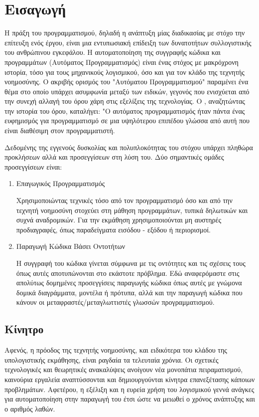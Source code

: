 \chapter{Εισαγωγή}

Η πράξη του προγραμματισμού, δηλαδή η ανάπτυξη μίας διαδικασίας με στόχο την επίτευξη ενός έργου, είναι μια εντυπωσιακή επίδειξη των δυνατοτήτων συλλογιστικής του ανθρώπινου εγκεφάλου. Η αυτοματοποίηση της συγγραφής κώδικα και προγραμμάτων (Αυτόματος Προγραμματισμός) είναι ένας στόχος με μακρόχρονη ιστορία, τόσο για τους μηχανικούς λογισμικού, όσο και για τον κλάδο της τεχνητής νοημοσύνης. Ο ακριβής ορισμός του "Αυτόματου Προγραμματισμού" παραμένει ένα θέμα στο οποίο υπάρχει ασυμφωνία μεταξύ των ειδικών, γεγονός που ενισχύεται από την συνεχή αλλαγή του όρου χάρη στις εξελίξεις της τεχνολογίας. Ο , αναζητώντας την ιστορία του όρου, καταλήγει: "Ο αυτόματος προγραμματισμός ήταν πάντα ένας ευφημισμός για προγραμματισμό σε μια υψηλότερου επιπέδου γλώσσα από αυτή που είναι διαθέσιμη στον προγραμματιστή.

Δεδομένης της εγγενούς δυσκολίας και πολυπλοκότητας του στόχου υπάρχει πληθώρα προκλήσεων αλλά και προσεγγίσεων στη λύση του. Δύο σημαντικές ομάδες προσεγγίσεων είναι:

\begin{enumerate}
\item Επαγωγικός Προγραμματισμός 

Χρησιμοποιώντας τεχνικές τόσο από τον προγραμματισμό όσο και από την τεχνητή νοημοσύνη στοχεύει στη μάθηση προγραμμάτων, τυπικά δηλωτικών και συχνά αναδρομικών. Για την εκμάθηση χρησιμοποιούνται μη αυστηρές προδιαγραφές, όπως παραδείγματα εισόδου - εξόδου ή περιορισμοί.
\item Παραγωγή Κώδικα Βάσει Οντοτήτων 

Η συγγραφή του κώδικα γίνεται σύμφωνα με τις οντότητες και τις σχέσεις τους όπως αυτές αποτυπώνονται στο εκάστοτε πρόβλημα. Εδώ αναφερόμαστε στις απολύτως δομημένες προσεγγίσεις παραγωγής κώδικα όπως αυτές με γνώμονα δομικά διαγράμματα, μοντέλα ή πρότυπα, αλλά και την παραγωγή κώδικα που κάνουν οι μεταφραστές/μεταγλωττιστές γλωσσών προγραμματισμού.
\end{enumerate}

\section{Κίνητρο}
Αφενός, η πρόοδος της τεχνητής νοημοσύνης, και ειδικότερα του κλάδου της υπολογιστικής εκμάθησης, είναι ραγδαία τα τελευταία χρόνια. Οι σχετικές τεχνολογικές και θεωρητικές ανακαλύψεις ανοίγουν νέα μονοπάτια πειραματισμού, καινούρια εργαλεία αναπτύσσονται και δημιουργούνται κίνητρα επανεξέτασης κάποιων προβλημάτων. Αφετέρου, η εξέλιξη και η ευρεία χρήση του λογισμικού γεννά ανάγκες για αυτοματοποίηση στην παραγωγή του έτσι ώστε να μειωθεί ο χρόνος ανάπτυξης και ο αριθμός λαθών.

